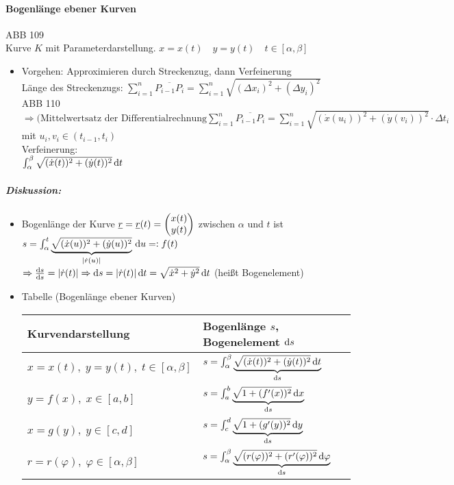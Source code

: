 \paragraph{Bogenlänge ebener Kurven}\parskp
ABB 109\\
Kurve $K$ mit Parameterdarstellung. $x=x(t) \quad y = y(t) \quad t \in [\alpha, \beta]$
\begin{itemize}
\item Vorgehen: Approximieren durch Streckenzug, dann Verfeinerung\\
Länge des Streckenzugs: $\sum_{i=1}^n \overline{P_{i-1}P_i}=\sum_{i=1}^n \sqrt{(\Delta x_i)^2+(\Delta y_i)^2}$\\
ABB 110\\
$\Rightarrow \text{(Mittelwertsatz der Differentialrechnung} \sum_{i=1}^n \overline{P_{i-1}P_i}= \sum_{i=1}^n \sqrt{(\dot{x}(u_i))^2 + (\dot{y}(v_i))^2}\cdot \Delta t_i$\\
mit $u_i, v_i\in (t_{i-1},t_i)$\\
Verfeinerung:\\
$\int_{\alpha}^{\beta} \sqrt{(\dot{x}(t))^2 + (\dot{y}(t))^2}\,\mathrm{d}t$
\end{itemize}
\subparagraph{Diskussion:}
\begin{itemize}
\item Bogenlänge der Kurve $\underline{r} = \underline{r}(t) = \begin{pmatrix}x(t) \\ y(t)\end{pmatrix}$ zwischen $\alpha$ und $t$ ist\\
$s=\int_{\alpha}^t \underbrace{\sqrt{(\dot{x}(u))^2 + (\dot{y}(u))^2}}_{|\dot{r}(u)|}\,\mathrm{d}u =: f(t)$\\
$\Rightarrow \frac{\mathrm{d}s}{\mathrm{d}s}= |\dot{r}(t)| \Rightarrow \mathrm{d}s=|\dot{r}(t)| \,\mathrm{d}t=\sqrt{\dot{x}^2+\dot{y}^2}\,\mathrm{d}t$ (heißt Bogenelement)
\item Tabelle (Bogenlänge ebener Kurven)\\
\begin{tabular}{l | l}
Kurvendarstellung & Bogenlänge $s$, Bogenelement $\mathrm{d}s$\\ 
\hline
$x=x(t),\; y=y(t),\; t \in [\alpha,\beta]$ & $s= \int_{\alpha}^{\beta} \underbrace{\sqrt{(\dot{x}(t))^2+(\dot{y}(t))^2}\,\mathrm{d}t}_{\mathrm{d}s}$\\
$y =f(x),\; x\in [a,b]$ & $s=\int_a^b\underbrace{\sqrt{1+(f'(x))^2}\,\mathrm{d}x}_{\mathrm{d}s}$\\
$x= g(y), \; y \in [c,d] $ & $s=\int_c^d\underbrace{\sqrt{1+(g'(y))^2}\,\mathrm{d}y}_{\mathrm{d}s}$\\
$r=r(\varphi), \; \varphi\in [\alpha, \beta]$ & $s=\int_{\alpha}^{\beta}\underbrace{\sqrt{(r(\varphi))^2+(r'(\varphi))^2}\,\mathrm{d}\varphi}_{\mathrm{d}s}$
\end{tabular}
\end{itemize}
